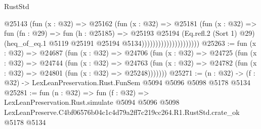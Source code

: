 \begin{lexlean}{RustStd}
\begin{coremodule}
                                    @25143
                                      (fun (x : @32) =>
                                      @25162
                                        (fun (x : @32) =>
                                        @25181
                                          (fun (x : @32) =>
                                          fun (fn : @29) =>
                                          fun (h : @25185) =>
                                          @25193
                                            @25194
                                            (Eq.refl.{2} (Sort 1) @29)
                                            (heq_of_eq.{1}
                                              @5119
                                              @25191
                                              @25194
                                              @5134)))))))))))))))))))))
@25263 := fun (x : @32) =>
  @24687
    (fun (x : @32) =>
    @24706
      (fun (x : @32) =>
      @24725
        (fun (x : @32) =>
        @24744
          (fun (x : @32) =>
          @24763 (fun (x : @32) => @24782 (fun (x : @32) => @24801 (fun (x : @32) => @25248)))))))
@25271 := (n : @32) -> (f : @32) -> LexLeanPreservation.Rust.FunSem @5094 @5096 @5098 @5178 @5134
@25281 := fun (n : @32) =>
  fun (f : @32) =>
  LexLeanPreservation.Rust.simulate
    @5094
    @5096
    @5098
    LexLeanPreserve.C4bf06576b04c1c4d79a2ff7c219cc264.R1.RustStd.crate_ok
    @5178
    @5134
\end{coremodule}
\end{lexlean}
